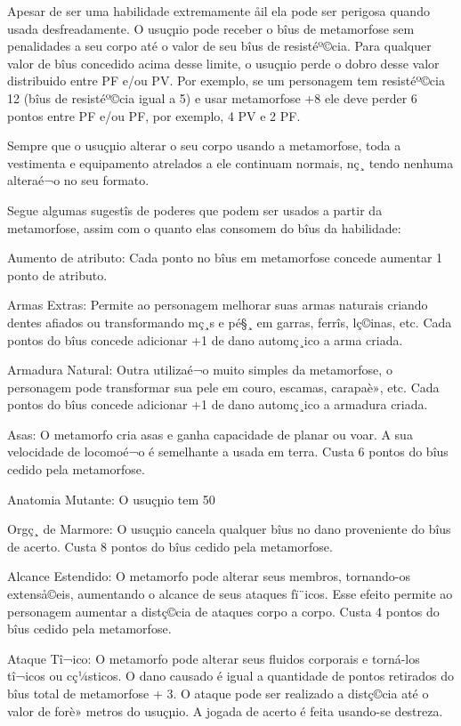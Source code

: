 Apesar de ser uma habilidade extremamente åil ela pode ser perigosa quando usada desfreadamente. O usuçµio pode receber o bîus de metamorfose sem penalidades a seu corpo até o valor de seu bîus de resistéº©cia. Para qualquer valor de bîus concedido acima desse limite, o usuçµio perde o dobro desse valor distribuido entre PF e/ou PV. Por exemplo, se um personagem tem resistéº©cia 12 (bîus de resistéº©cia igual a 5) e usar metamorfose +8 ele deve perder 6 pontos entre PF e/ou PF, por exemplo, 4 PV e 2 PF.
	
	Sempre que o usuçµio alterar o seu corpo usando a metamorfose, toda a vestimenta e equipamento atrelados a ele continuam normais, nç¸ tendo nenhuma alteraé¬o no seu formato.

	Segue algumas sugestîs de poderes que podem ser usados a partir da metamorfose, assim com o quanto elas consomem do bîus da habilidade:


	 Aumento de atributo: Cada ponto no bîus em metamorfose concede aumentar 1 ponto de atributo. 

	 		Armas Extras: Permite ao personagem melhorar suas armas naturais criando dentes afiados ou transformando mç¸s e pé§¸ em garras, ferrîs, lç©inas, etc. Cada  pontos do bîus concede adicionar +1 de dano automç¸ico a arma criada.

		 	Armadura Natural: Outra utilizaé¬o muito simples da metamorfose, o personagem pode transformar sua pele em couro, escamas, carapaè», etc. Cada  pontos do bîus concede adicionar +1 de dano automç¸ico a armadura criada.

	 		Asas: O metamorfo cria asas e ganha capacidade de planar ou voar. A sua velocidade de locomoé¬o é semelhante a usada em terra. Custa 6 pontos do bîus cedido pela metamorfose.

	 		Anatomia Mutante:  O usuçµio tem 50%
	
	 		Orgç¸ de Marmore:  O usuçµio cancela qualquer bîus no dano proveniente do bîus de acerto. Custa 8 pontos do bîus cedido pela metamorfose.

	 		Alcance Estendido: O metamorfo pode alterar seus membros, tornando-os extenså©eis, aumentando o alcance de seus ataques fï¨icos. Esse efeito permite ao personagem aumentar a distç©cia de ataques corpo a corpo. Custa 4 pontos do bîus cedido pela metamorfose.

	 		Ataque Tî¬ico: O metamorfo pode alterar seus fluidos corporais e torná-los tî¬icos ou cç¼sticos. O dano causado é igual a quantidade de pontos retirados do bîus total de metamorfose + 3. O ataque pode ser realizado a distç©cia até o valor de forè» metros do usuçµio. A jogada de acerto é feita usando-se destreza. 

